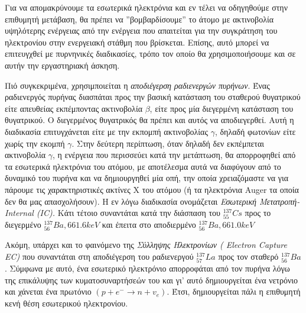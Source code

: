 \documentclass[a4paper]{article}
\begin{document}
	Για να απομακρύνουμε τα εσωτερικά ηλεκτρόνια και εν τέλει να οδηγηθούμε στην επιθυμητή μετάβαση, θα πρέπει να ''βομβαρδίσουμε'' το άτομο με ακτινοβολία υψηλότερης ενέργειας από την ενέργεια που απαιτείται για την συγκράτηση του ηλεκτρονίου στην ενεργειακή στάθμη που βρίσκεται. Επίσης, αυτό μπορεί να επιτευγχθεί με πυρνηνικές διαδικασίες, τρόπο τον οποίο θα χρησιμοποιήσουμε και σε αυτήν την εργαστηριακή άσκηση.
	
	
	Πιό συγκεκριμένα, χρησιμποιείται η \textit{αποδιέγερση ραδιενεργών πυρήνων}. Ένας ραδιενεργός πυρήνας διασπάται προς την βασική κατάσταση του σταθερού θυγατρικού είτε απευθείας εκπέμποντας ακτινοβολία $\beta$, είτε προς μία διεγερμένη κατάσταση του θυγατρικού. Ο διεγερμένος θυγατρικός θα πρέπει και αυτός να αποδιεγερθεί. Αυτή η διαδικασία επιτυγχάνεται είτε με την εκπομπή ακτινοβολίας $\gamma$, δηλαδή φωτονίων είτε χωρίς την εκομπή $\gamma$.
	 Στην δεύτερη περίπτωση, όταν δηλαδή δεν εκπέμπεται ακτινοβολία $\gamma$, η ενέργεια που περισσεύει κατά την μετάπτωση, θα απορροφηθεί από τα εσωτερικά ηλεκτρόνια του ατόμου, με αποτέλεσμα αυτά να διαφύγουν από το δυναμικό του πυρήνα και να δημιουργηθεί μία οπή, την οποία χρειαζόμαστε να για πάρουμε τις χαρακτηριστικές ακτίνες Χ του ατόμου (ή τα ηλεκτρόνια Auger τα οποία δεν θα μας απασχολήσουν). Η εν λόγω διαδικασία ονομάζεται \textit{Εσωτερική Μετατροπή-Internal (IC).} Κάτι τέτοιο συναντάται κατά την διάσπαση του $^{137}_{55}Cs$ προς το διεγερμένο $^{137}_{56}Ba, 661.6keV$ και έπειτα στο αποδιερμένο $^{137}_{56}Ba, 661.0keV$
	
	
	Ακόμη, υπάρχει και το φαινόμενο της \textit{Σύλληψης Ηλεκτρονίων ( Electron Capture EC)} που συναντάται στη αποδιέγερση του ραδιενεργού $^{137}_{57}La$ προς τον σταθερό $^{137}_{56}Ba$. Σύμφωνα με αυτό, ένα εσωτερικό ηλεκτρόνιο απορροφάται από τον πυρήνα λόγω της επικάλυψης των κυματοσυναρτήσεών του και γι' αυτό δημιουργείται ένα νετρόνιο και χάνεται ένα πρωτόνιο $(p+e^-\rightarrow n+v_e)$. Έτσι, δημιουργείται πάλι η επιθυμητή κενή θέση εσωτερικού ηλεκτρονίου.
	
\end{document}
